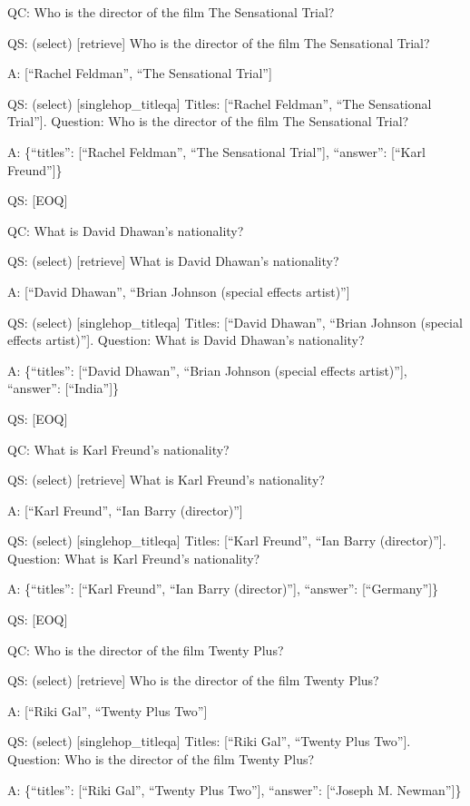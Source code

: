 \documentclass[
]{article}
\begin{document}
QC: Who is the director of the film The Sensational Trial?

QS: (select) {[}retrieve{]} Who is the director of the film The
Sensational Trial?

A: {[}``Rachel Feldman'', ``The Sensational Trial''{]}

QS: (select) {[}singlehop\_titleqa{]} Titles: {[}``Rachel Feldman'',
``The Sensational Trial''{]}. Question: Who is the director of the film
The Sensational Trial?

A: \{``titles'': {[}``Rachel Feldman'', ``The Sensational Trial''{]},
``answer'': {[}``Karl Freund''{]}\}

QS: {[}EOQ{]}

QC: What is David Dhawan's nationality?

QS: (select) {[}retrieve{]} What is David Dhawan's nationality?

A: {[}``David Dhawan'', ``Brian Johnson (special effects artist)''{]}

QS: (select) {[}singlehop\_titleqa{]} Titles: {[}``David Dhawan'',
``Brian Johnson (special effects artist)''{]}. Question: What is David
Dhawan's nationality?

A: \{``titles'': {[}``David Dhawan'', ``Brian Johnson (special effects
artist)''{]}, ``answer'': {[}``India''{]}\}

QS: {[}EOQ{]}

QC: What is Karl Freund's nationality?

QS: (select) {[}retrieve{]} What is Karl Freund's nationality?

A: {[}``Karl Freund'', ``Ian Barry (director)''{]}

QS: (select) {[}singlehop\_titleqa{]} Titles: {[}``Karl Freund'', ``Ian
Barry (director)''{]}. Question: What is Karl Freund's nationality?

A: \{``titles'': {[}``Karl Freund'', ``Ian Barry (director)''{]},
``answer'': {[}``Germany''{]}\}

QS: {[}EOQ{]}

QC: Who is the director of the film Twenty Plus?

QS: (select) {[}retrieve{]} Who is the director of the film Twenty Plus?

A: {[}``Riki Gal'', ``Twenty Plus Two''{]}

QS: (select) {[}singlehop\_titleqa{]} Titles: {[}``Riki Gal'', ``Twenty
Plus Two''{]}. Question: Who is the director of the film Twenty Plus?

A: \{``titles'': {[}``Riki Gal'', ``Twenty Plus Two''{]}, ``answer'':
{[}``Joseph M. Newman''{]}\}
\end{document}
